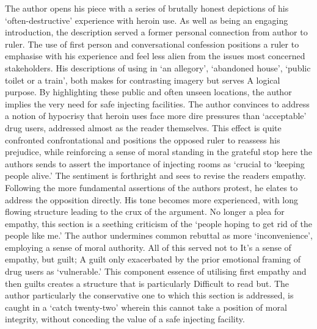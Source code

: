 \documentclass[a4paper]{article}
\begin{document}
The author opens his piece with a series of brutally honest depictions of his ‘often-destructive’ experience with heroin use. As well as being an engaging introduction, the description served a former personal connection from author to ruler. The use of first person and conversational confession positions a ruler to emphasise with his experience and feel less alien from the issues most concerned stakeholders. His descriptions of using in ‘an allegory’, ‘abandoned house’,  ‘public toilet or a train’, both makes for contrasting imagery but serves A logical purpose. By highlighting these public and often unseen locations, the author implies the very need for safe injecting facilities. The author convinces to address a notion of hypocrisy that heroin uses face more dire pressures than ‘acceptable’ drug users, addressed almost as the reader themselves. This effect is quite confronted confrontational and positions the opposed ruler to reassess his prejudice, while reinforcing a sense of moral standing in the grateful stop here the authors sends to assert the importance of injecting rooms as ‘crucial to ‘keeping people alive.’ The sentiment is forthright and sees to revise the readers empathy.\\

Following the more fundamental assertions of the authors protest, he elates to address the opposition directly. His tone becomes more experienced, with long flowing structure leading to the crux of the argument. No longer a plea for empathy, this section is a seething criticism of the ‘people hoping to get rid of the people like me.’ The author undermines common rebuttal as more ‘inconvenience’, employing a sense of moral authority. All of this served not to It's a sense of empathy, but guilt; A guilt only exacerbated by the prior emotional framing of drug users as ‘vulnerable.’ This component essence of utilising first empathy and then guilts creates a structure that is particularly Difficult to read but. The author particularly the conservative one to which this section is addressed, is caught in a ‘catch twenty-two’ wherein this cannot take a position of moral integrity, without conceding the value of a safe injecting facility.\\
\end{document}
